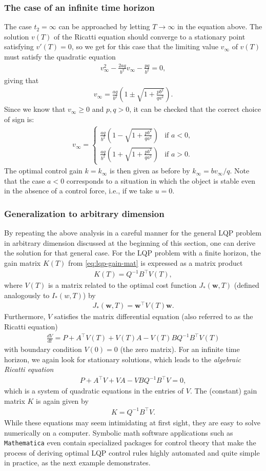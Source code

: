 \documentclass[12pt]{amsart}
\newcommand{\eqst}[1]{\begin{align*}#1\end{align*}}
\newcommand{\der}[2]{\frac{d#1}{d#2}}
\newcounter{example}
\begin{document}
\subsubsection{The case of an infinite time horizon} The case $t_2=\infty$ can be approached by letting $T\to\infty$ in the equation above. The solution $v(T)$ of the Ricatti equation should converge to a stationary point satisfying $v'(T)=0$, so we get for this case that the limiting value $v_\infty$ of $v(T)$ must satisfy the quadratic equation
\eqst{ 
v_\infty^2 - \frac{2aq}{b^2} v_\infty - \frac{pq}{b^2} = 0, 
}
giving that
\eqst{
v_\infty = \frac{aq}{b^2}\left( 1 \pm \sqrt{1+\frac{pb^2}{qa^2}}\right).
}
Since we know that $v_\infty\ge 0$ and $p,q>0$, it can be checked that the correct choice of sign is:
\eqst{
v_\infty = \begin{cases}
\frac{aq}{b^2}\left( 1 - \sqrt{1+\frac{pb^2}{qa^2}}\right)
&
\textrm{if }a<0,  \\
\frac{aq}{b^2}\left( 1 + \sqrt{1+\frac{pb^2}{qa^2}}\right)
&
\textrm{if }a>0.
\end{cases}
}
The optimal control gain $k=k_\infty$ is then given as before by $k_\infty = b v_\infty/q$.
Note that the case $a<0$ corresponds to a situation in which the object is stable even in the absence of a control force, i.e., if we take $u=0$.

\subsubsection{Generalization to arbitrary dimension}

By repeating the above analysis in a careful manner for the general LQP problem in arbitrary dimension discussed at the beginning of this section, one can derive the solution for that general case. For the LQP problem with a finite horizon, the gain matrix $K(T)$ from \eqref{eq:lqp-gain-mat} is expressed as a matrix product
\eqst{
K(T) = Q^{-1}B^\top V(T),
}
where $V(T)$ is a matrix related to the optimal cost function $J_*(\mathbf{w},T)$ (defined analogously to $I_*(w,T)$) by
\eqst{
J_*(\mathbf{w},T) = \mathbf{w}^\top V(T)\mathbf{w}.
}
Furthermore, $V$ satisfies the matrix differential equation (also referred to as the Ricatti equation)
\eqst{
\der{V}{t} = P + A^\top V(T) + V(T) A - V(T) B Q^{-1} B^\top V(T)
}
with boundary condition $V(0) = 0$ (the zero matrix). For an infinite time horizon, we again look for stationary solutions, which leads to the \emph{algebraic Ricatti equation}
\eqst{
P + A^\top V + V A - V B Q^{-1} B^\top V = 0,
}
which is a system of quadratic equations in the entries of $V$.
The (constant) gain matrix $K$ is again given by
\eqst{
K = Q^{-1}B^\top V.
}
While these equations may seem intimidating at first sight, they are easy to solve numerically on a computer. Symbolic math software applications such as \texttt{Mathematica} even contain specialized packages for control theory that make the process of deriving optimal LQP control rules highly automated and quite simple in practice, as the next example demonstrates.
\end{document}
